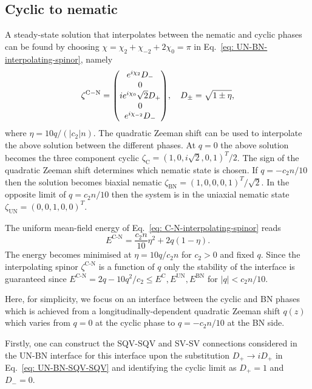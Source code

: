 \subsection{Cyclic to nematic}
A steady-state solution that interpolates between the nematic and cyclic phases
can be found by choosing \(\chi = \chi_2 + \chi_{-2} + 2\chi_0 = \pi \) in
Eq.~\eqref{eq: UN-BN-interpolating-spinor}, namely
\begin{equation}\label{eq: C-N-interpolating-spinor}
    \zeta^\mathrm{C-N} = \mqty(
    e^{i\chi_2}D_- \\
    0 \\
    ie^{i\chi_0}\sqrt{2}D_+ \\
    0 \\
    e^{i\chi_{-2}}D_-),
    \quad D_\pm = \sqrt{1\pm\eta},
\end{equation}
where \(\eta = 10q/(|c_2|n)\).
The quadratic Zeeman shift can be used to interpolate the above solution between
the different phases.
At \(q = 0\) the above solution becomes the three component cyclic
\(\zeta_\mathrm{C} = {(1, 0, i\sqrt{2}, 0, 1)}^T/2\).
The sign of the quadratic Zeeman shift determines which nematic state is chosen.
If \(q = -c_2n/10\) then the solution becomes biaxial nematic
\(\zeta_\mathrm{BN} = {(1, 0, 0, 0, 1)}^T/\sqrt{2}\).
In the opposite limit of \(q = c_2n/10\) then the system is in the uniaxial
nematic state \(\zeta_\mathrm{UN} = {(0, 0, 1, 0, 0)}^T\).

The uniform mean-field energy of Eq.~\eqref{eq: C-N-interpolating-spinor} reads
\begin{equation}
    E^\text{C-N} = \frac{c_2n}{10}\eta^2 + 2q(1 - \eta).
\end{equation}
The energy becomes minimised at \(\eta = 10q/c_2n\) for \(c_2 > 0\) and fixed
\(q\).
Since the interpolating spinor \(\zeta^\text{C-N}\) is a function of \(q\) only
the stability of the interface is guaranteed since \(E^\text{C-N} =
2q-10q^2/c_2 \leq E^\text{C}, E^\text{UN},
E^\text{BN}\) for \(|q| < c_2n/10\).

Here, for simplicity, we focus on an interface between the cyclic and BN phases
which is achieved from a longitudinally-dependent quadratic Zeeman shift
\(q(z)\) which varies from \(q = 0\) at the cyclic phase to \(q = -c_2n/10\)
at the BN side.

Firstly, one can construct the SQV-SQV and SV-SV connections considered in the
UN-BN interface for this interface upon the substitution
\(D_+ \rightarrow iD_+\) in Eq.~\eqref{eq: UN-BN-SQV-SQV} and identifying the
cyclic limit as \(D_+ = 1\) and \(D_- = 0\).

